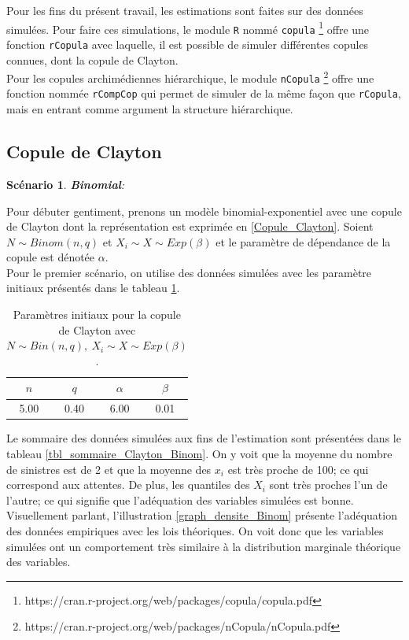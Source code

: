 \documentclass{article}
\newtheorem{Scenario}{Scénario}
\begin{document}
	Pour les fins du présent travail, les estimations sont faites sur des données simulées. Pour faire ces simulations, le module \texttt{R} nommé \texttt{copula} \footnote{https://cran.r-project.org/web/packages/copula/copula.pdf}
	offre une fonction \texttt{rCopula} avec laquelle, il est possible de simuler différentes copules connues, dont la copule de Clayton. \\
	
	Pour les copules archimédiennes hiérarchique, le module \texttt{nCopula} \footnote{https://cran.r-project.org/web/packages/nCopula/nCopula.pdf} offre une fonction nommée \texttt{rCompCop} qui permet de simuler de la même façon que \texttt{rCopula}, mais en entrant comme argument la structure hiérarchique.
	
	\subsection{Copule de Clayton}
	\begin{Scenario}\label{scenario_Clayton_Binom}
		\textbf{Binomial}:
	\end{Scenario}
		Pour débuter gentiment, prenons un modèle binomial-exponentiel avec une copule de Clayton dont la représentation est exprimée en \eqref{Copule_Clayton}.
		Soient $N \sim Binom(n,q)$ et $X_i \sim X \sim Exp(\beta)$ et le paramètre de dépendance de la copule est dénotée $\alpha$.\\
	
	
	 Pour le premier scénario, on utilise des données simulées avec les paramètre initiaux présentés dans le tableau \ref{tbl_para_initiaux_Clayton_Binom}.
	 
	 \begin{table}[H]
	 	\centering
	 	\begin{tabular}{cccc}
	 		\hline
	 		$n$ & $q$ & $\alpha$ & $\beta$ \\ 
	 		\hline
	 		5.00 & 0.40 & 6.00 & 0.01 \\ 
	 		\hline
	 	\end{tabular}
 	\caption{Paramètres initiaux pour la copule de Clayton avec $N \sim Bin(n, q),\ X_i \sim X \sim Exp(\beta)$.}
 	\label{tbl_para_initiaux_Clayton_Binom}
	 \end{table}
	 
	 Le sommaire des données simulées aux fins de l'estimation sont présentées dans le tableau \ref{tbl_sommaire_Clayton_Binom}. On y voit que la moyenne du nombre de sinistres est de 2 et que la moyenne des $x_i$ est très proche de 100; ce qui correspond aux attentes.
	 De plus, les quantiles des $X_i$ sont très proches l'un de l'autre; ce qui signifie que l'adéquation des variables simulées est bonne. Visuellement parlant, l'illustration \ref{graph_densite_Binom} présente l'adéquation des données empiriques avec les lois théoriques. On voit donc que les variables simulées ont un comportement très similaire à la distribution marginale théorique des variables.\\
	
\end{document}
